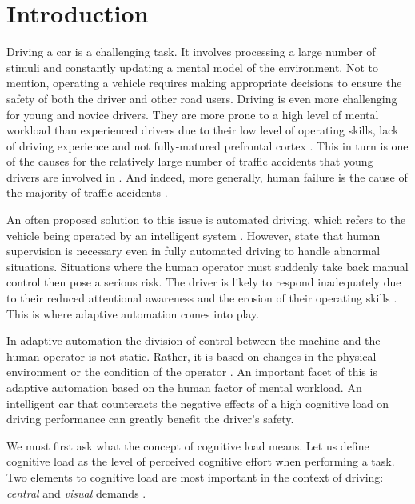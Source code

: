 
\section{Introduction}\label{sec:introduction}

Driving a car is a challenging task. 
It involves processing a large number of stimuli and constantly updating a mental model of the environment.
Not to mention, operating a vehicle requires making appropriate decisions to ensure the safety of both the driver and other road users.
Driving is even more challenging for young and novice drivers. 
They are more prone to a high level of mental workload than experienced drivers due to their low level of operating skills, lack of driving experience \citep{Gregersen1996} and not fully-matured prefrontal cortex \citep{Ross2014}.
This in turn is one of the causes for the relatively large number of traffic accidents that young drivers are involved in \citep{Sena2013}.
And indeed, more generally, human failure is the cause of the majority of traffic accidents \citep{DeWaard1996}.

An often proposed solution to this issue is automated driving, which refers to the vehicle being operated by an intelligent system \citep{Cabrall2018}.
However, \citet{Brookhuis2007} state that human supervision is necessary even in fully automated driving to handle abnormal situations.
Situations where the human operator must suddenly take back manual control then pose a serious risk.
The driver is likely to respond inadequately due to their reduced attentional awareness and the erosion of their operating skills \citep{Dijksterhuis2012}.
This is where adaptive automation comes into play.

In adaptive automation the division of control between the machine and the human operator is not static.
Rather, it is based on changes in the physical environment or the condition of the operator \citep{Sheridan2011}.
An important facet of this is adaptive automation based on the human factor of mental workload.
An intelligent car that counteracts the negative effects of a high cognitive load on driving performance can greatly benefit the driver's safety.

We must first ask what the concept of cognitive load means.
Let us define cognitive load as the level of perceived cognitive effort when performing a task.
Two elements to cognitive load are most important in the context of driving: \textit{central} and \textit{visual} demands \citep{DeWaard1996}. 

